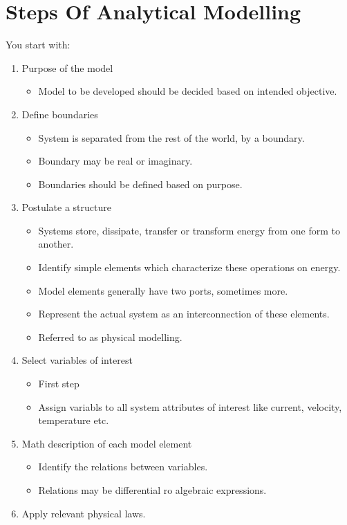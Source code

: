 \documentclass[twoside]{report}
\begin{document}
\section{Steps Of Analytical Modelling}
You start with:
\begin{enumerate}
	\item Purpose of the model
		\begin{itemize}
			\item Model to be developed should be decided based on intended objective. 
		\end{itemize}
	\item Define boundaries 
		\begin{itemize}
			\item System is separated from the rest of the world, by a boundary. 
			\item Boundary may be real or imaginary.
			\item Boundaries should be defined based on purpose.
		\end{itemize}
	\item Postulate a structure 
		\begin{itemize}
			\item Systems store, dissipate, transfer or transform energy from one form to another. 
			\item Identify simple elements which characterize these operations on energy.
			\item Model elements generally have two ports, sometimes more.
			\item Represent the actual system as an interconnection of these elements.
			\item Referred to as physical modelling.
		\end{itemize}
	\item Select variables of interest
		\begin{itemize}
			\item First step 
			\item Assign variabls to all system attributes of interest like current, velocity, temperature etc.
		\end{itemize}
	\item Math description of each model element
		\begin{itemize}
			\item Identify the relations between variables. 
			\item Relations may be differential ro algebraic expressions.
		\end{itemize}
	\item Apply relevant physical laws.

\end{enumerate}
\end{document}
